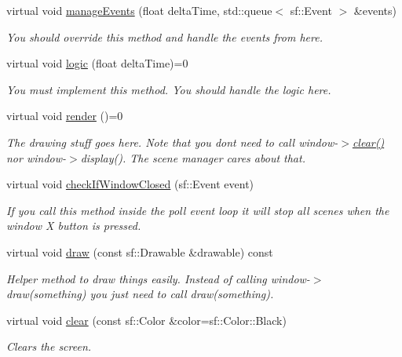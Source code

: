 \begin{DoxyCompactItemize}
virtual void \hyperlink{classzt_1_1_scene_ac450fd3460c158c0a3f2661df0410477}{manage\+Events} (float delta\+Time, std\+::queue$<$ sf\+::\+Event $>$ \&events)
\begin{DoxyCompactList}\small\item\em You should override this method and handle the events from here. \end{DoxyCompactList}\item 
\mbox{\label{classzt_1_1_scene_a1150eb60893f3077ecacf94b309414bf}} 
virtual void \hyperlink{classzt_1_1_scene_a1150eb60893f3077ecacf94b309414bf}{logic} (float delta\+Time)=0
\begin{DoxyCompactList}\small\item\em You must implement this method. You should handle the logic here. \end{DoxyCompactList}\item 
\mbox{\label{classzt_1_1_scene_aa554c0468228aa1aab7e553c52c7b0d4}} 
virtual void \hyperlink{classzt_1_1_scene_aa554c0468228aa1aab7e553c52c7b0d4}{render} ()=0
\begin{DoxyCompactList}\small\item\em The drawing stuff goes here. Note that you don\textquotesingle{}t need to call window-\/$>$\hyperlink{classzt_1_1_scene_ae8a778b82813dca9d6153fdcb38896a1}{clear()} nor window-\/$>$display(). The scene manager cares about that. \end{DoxyCompactList}\item 
\mbox{\label{classzt_1_1_scene_acfd0b618da5ada48d96b93c8859247af}} 
virtual void \hyperlink{classzt_1_1_scene_acfd0b618da5ada48d96b93c8859247af}{check\+If\+Window\+Closed} (sf\+::\+Event event)
\begin{DoxyCompactList}\small\item\em If you call this method inside the poll event loop it will stop all scenes when the window X button is pressed. \end{DoxyCompactList}\item 
\mbox{\label{classzt_1_1_scene_ac0fa65322c3b81f42b2386d14e55e14f}} 
virtual void \hyperlink{classzt_1_1_scene_ac0fa65322c3b81f42b2386d14e55e14f}{draw} (const sf\+::\+Drawable \&drawable) const
\begin{DoxyCompactList}\small\item\em Helper method to draw things easily. Instead of calling window-\/$>$draw(something) you just need to call draw(something). \end{DoxyCompactList}\item 
virtual void \hyperlink{classzt_1_1_scene_ae8a778b82813dca9d6153fdcb38896a1}{clear} (const sf\+::\+Color \&color=sf\+::\+Color\+::\+Black)
\begin{DoxyCompactList}\small\item\em Clears the screen. \end{DoxyCompactList}\end{DoxyCompactItemize}
